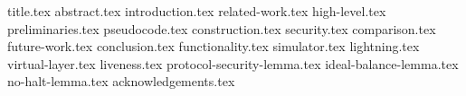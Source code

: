 \documentclass[sigconf]{acmart}
\begin{document}
\pagestyle{plain}


{title.tex}
{abstract.tex}
{introduction.tex}
{related-work.tex}
{high-level.tex}
{preliminaries.tex}
{pseudocode.tex}
{construction.tex}
{security.tex}
{comparison.tex}
{future-work.tex}
{conclusion.tex}
{functionality.tex}
{simulator.tex}
{lightning.tex}
{virtual-layer.tex}
{liveness.tex}
{protocol-security-lemma.tex}
{ideal-balance-lemma.tex}
{no-halt-lemma.tex}
{acknowledgements.tex}


\end{document}
